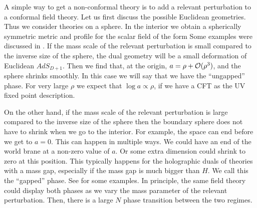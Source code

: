 A simple way to get a non-conformal theory is to add a relevant perturbation to
a conformal field theory.
 Let us first discuss the possible Euclidean geometries. Thus we  consider theories on a sphere. In the interior we obtain a spherically symmetric metric and
profile for the scalar field of the form
\eqn{}
Some  examples were discussed in  
.
If  the mass scale of the  relevant perturbation is small compared to the inverse
size of the sphere, the
dual geometry will be a small deformation of Euclidean $AdS_{D+1}$.
 Then we find that, at the origin, $a =  \rho + {\cal O}(\rho^3)$, and the sphere
shrinks smoothly. In this case we will say that we have the ``ungapped'' phase.
For very large $\rho$ we expect that $\log a \propto \rho $, if we have a CFT as the UV fixed point description.


\ifig{} {}


On the other hand, if the mass  scale of the relevant perturbation is large compared to the inverse size of
the sphere then the boundary sphere does not have to shrink when we go to the interior. For example,
the space can end before we get to $a=0$.
 This can happen in multiple ways. We could have an end of
the world brane at a non-zero  value of $a$.
Or some extra dimension could shrink to zero at this position. This typically happens for
the holographic duals of theories with a mass gap, especially if the mass gap is much bigger than $H$.
We call this the ``gapped'' phase.
See  for some examples.
In principle,  the same field theory could display both phases as we vary the mass parameter
of the relevant perturbation. Then, there is  a large $N$ phase transition between the two regimes.


